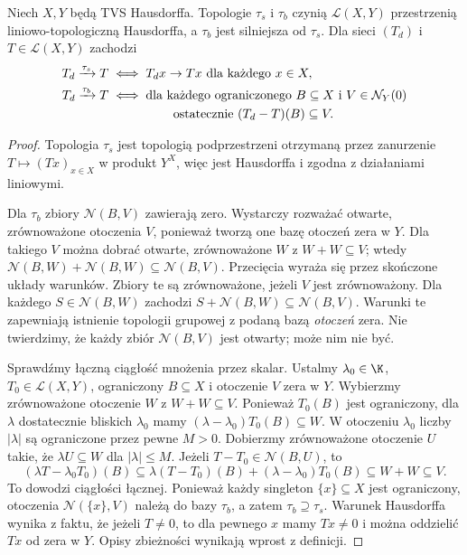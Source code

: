 \begin{twierdzenie}
\label{thm:op-topologies}
Niech $X,Y$ będą TVS Hausdorffa. Topologie $\tau_s$ i
$\tau_b$ czynią $\mathcal L(X,Y)$ przestrzenią
liniowo-topologiczną Hausdorffa, a $\tau_b$ jest silniejsza
od $\tau_s$. Dla sieci $(T_d)$ i $T\in\mathcal L(X,Y)$
zachodzi
\begin{align*}
 T_d\xrightarrow{\tau_s}T
 &\iff T_dx\to Tx\ \text{dla każdego }x\in X,\\
 T_d\xrightarrow{\tau_b}T
 &\iff \text{dla każdego ograniczonego }B\subseteq X
 \text{ i }V\in\mathcal N_Y(0)\\
 &\hspace{18mm}\text{ostatecznie }(T_d-T)(B)\subseteq V.
\end{align*}
\end{twierdzenie}
\begin{proof}
Topologia $\tau_s$ jest topologią podprzestrzeni
otrzymaną przez zanurzenie $T\mapsto(Tx)_{x\in X}$
w produkt $Y^X$, więc jest Hausdorffa i zgodna z
działaniami liniowymi.

Dla $\tau_b$ zbiory $\mathcal N(B,V)$ zawierają zero.
Wystarczy rozważać otwarte, zrównoważone otoczenia $V$,
ponieważ tworzą one bazę otoczeń zera w $Y$.
Dla takiego $V$ można dobrać otwarte, zrównoważone
$W$ z $W+W\subseteq V$;
wtedy
$\mathcal N(B,W)+\mathcal N(B,W)\subseteq\mathcal N(B,V)$.
Przecięcia wyraża się przez skończone układy warunków.
Zbiory te są zrównoważone, jeżeli $V$ jest zrównoważony.
Dla każdego $S\in\mathcal N(B,W)$ zachodzi
$S+\mathcal N(B,W)\subseteq\mathcal N(B,V)$.
Warunki te zapewniają istnienie topologii grupowej
z podaną bazą \emph{otoczeń} zera. Nie twierdzimy, że każdy
zbiór $\mathcal N(B,V)$ jest otwarty; może nim nie być.

Sprawdźmy łączną ciągłość mnożenia przez skalar.
Ustalmy $\lambda_0\in\K$, $T_0\in\mathcal L(X,Y)$,
ograniczony $B\subseteq X$ i otoczenie $V$ zera w $Y$.
Wybierzmy zrównoważone otoczenie $W$ z $W+W\subseteq V$.
Ponieważ $T_0(B)$ jest ograniczony, dla $\lambda$
dostatecznie bliskich $\lambda_0$ mamy
$(\lambda-\lambda_0)T_0(B)\subseteq W$.
W otoczeniu $\lambda_0$ liczby $|\lambda|$ są ograniczone
przez pewne $M>0$. Dobierzmy zrównoważone otoczenie
$U$ takie, że $\lambda U\subseteq W$ dla $|\lambda|\le M$.
Jeżeli $T-T_0\in\mathcal N(B,U)$, to
\[
 (\lambda T-\lambda_0T_0)(B)
 \subseteq\lambda(T-T_0)(B)+(\lambda-\lambda_0)T_0(B)
 \subseteq W+W\subseteq V.
\]
To dowodzi ciągłości łącznej. Ponieważ każdy singleton
$\{x\}\subseteq X$ jest ograniczony, otoczenia
$\mathcal N(\{x\},V)$ należą do bazy $\tau_b$,
a zatem $\tau_b\supseteq\tau_s$. Warunek Hausdorffa
wynika z faktu, że jeżeli $T\ne0$, to dla pewnego $x$
mamy $Tx\ne0$ i można oddzielić $Tx$ od zera w $Y$.
Opisy zbieżności wynikają wprost z definicji.
\end{proof}


